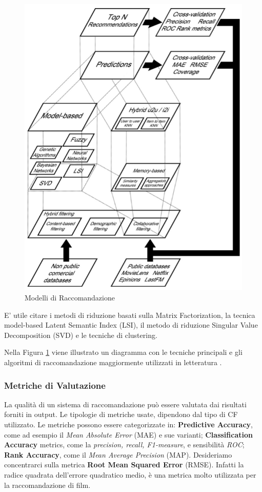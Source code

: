 \documentclass[12pt]{article}
\begin{document}
\begin{figure}[H]
	\centering
	\includegraphics[scale=0.40]{images/model-recomm.png}
	\caption{Modelli di Raccomandazione \cite{Bobadilla:2013:RSS:2483330.2483573}}
	\label{model-rec}
\end{figure}

E' utile citare i metodi di riduzione basati sulla Matrix Factorization, la tecnica model-based Latent Semantic Index (LSI), il metodo di riduzione Singular Value Decomposition
(SVD) e le tecniche di clustering.

Nella Figura \ref{model-rec} viene illustrato un diagramma con le tecniche principali e gli algoritmi di raccomandazione maggiormente utilizzati in letteratura \cite{Bobadilla:2013:RSS:2483330.2483573}.

\subsubsection{Metriche di Valutazione}
La qualità di un sistema di raccomandazione può essere valutata dai risultati forniti in output. Le tipologie di metriche usate, dipendono dal tipo di CF utilizzato. Le metriche possono essere categorizzate in:
\textbf{Predictive Accuracy}, come ad esempio il \textit{Mean Absolute Error}
(MAE) e sue varianti; \textbf{Classification Accuracy} metrics, come la \textit{precision, recall, F1-measure}, e sensibilità \textit{ROC}; \textbf{Rank Accuracy}, come il \textit{Mean Average Precision} (MAP).
Desideriamo concentrarci sulla metrica \textbf{Root Mean Squared Error} (RMSE). Infatti la radice quadrata dell'errore quadratico medio, è una metrica molto utilizzata per la raccomandazione di film.
\end{document}
